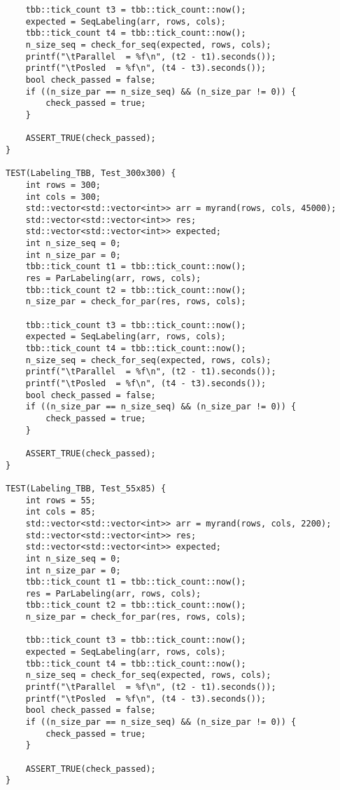 \documentclass{report}
\begin{document}
\begin{lstlisting}
    tbb::tick_count t3 = tbb::tick_count::now();
    expected = SeqLabeling(arr, rows, cols);
    tbb::tick_count t4 = tbb::tick_count::now();
    n_size_seq = check_for_seq(expected, rows, cols);
    printf("\tParallel  = %f\n", (t2 - t1).seconds());
    printf("\tPosled  = %f\n", (t4 - t3).seconds());
    bool check_passed = false;
    if ((n_size_par == n_size_seq) && (n_size_par != 0)) {
        check_passed = true;
    }

    ASSERT_TRUE(check_passed);
}

TEST(Labeling_TBB, Test_300x300) {
    int rows = 300;
    int cols = 300;
    std::vector<std::vector<int>> arr = myrand(rows, cols, 45000);
    std::vector<std::vector<int>> res;
    std::vector<std::vector<int>> expected;
    int n_size_seq = 0;
    int n_size_par = 0;
    tbb::tick_count t1 = tbb::tick_count::now();
    res = ParLabeling(arr, rows, cols);
    tbb::tick_count t2 = tbb::tick_count::now();
    n_size_par = check_for_par(res, rows, cols);

    tbb::tick_count t3 = tbb::tick_count::now();
    expected = SeqLabeling(arr, rows, cols);
    tbb::tick_count t4 = tbb::tick_count::now();
    n_size_seq = check_for_seq(expected, rows, cols);
    printf("\tParallel  = %f\n", (t2 - t1).seconds());
    printf("\tPosled  = %f\n", (t4 - t3).seconds());
    bool check_passed = false;
    if ((n_size_par == n_size_seq) && (n_size_par != 0)) {
        check_passed = true;
    }

    ASSERT_TRUE(check_passed);
}

TEST(Labeling_TBB, Test_55x85) {
    int rows = 55;
    int cols = 85;
    std::vector<std::vector<int>> arr = myrand(rows, cols, 2200);
    std::vector<std::vector<int>> res;
    std::vector<std::vector<int>> expected;
    int n_size_seq = 0;
    int n_size_par = 0;
    tbb::tick_count t1 = tbb::tick_count::now();
    res = ParLabeling(arr, rows, cols);
    tbb::tick_count t2 = tbb::tick_count::now();
    n_size_par = check_for_par(res, rows, cols);

    tbb::tick_count t3 = tbb::tick_count::now();
    expected = SeqLabeling(arr, rows, cols);
    tbb::tick_count t4 = tbb::tick_count::now();
    n_size_seq = check_for_seq(expected, rows, cols);
    printf("\tParallel  = %f\n", (t2 - t1).seconds());
    printf("\tPosled  = %f\n", (t4 - t3).seconds());
    bool check_passed = false;
    if ((n_size_par == n_size_seq) && (n_size_par != 0)) {
        check_passed = true;
    }

    ASSERT_TRUE(check_passed);
}


\end{lstlisting}
\end{document}
